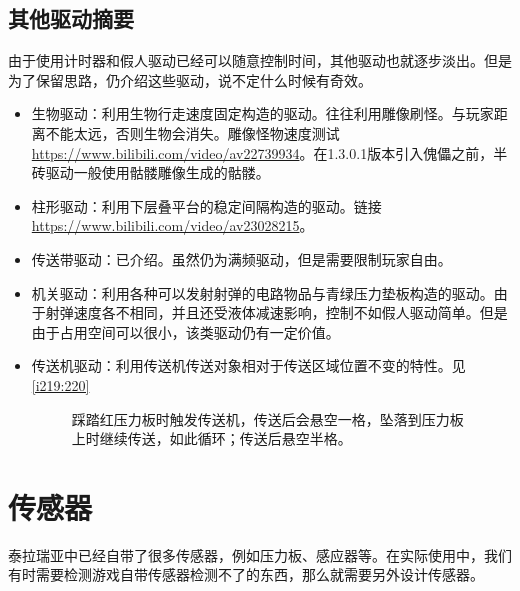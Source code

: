 \subsection{其他驱动摘要}
由于使用计时器和假人驱动已经可以随意控制时间，其他驱动也就逐步淡出。但是为了保留思路，仍介绍这些驱动，说不定什么时候有奇效。
\begin{itemize}
\item 生物驱动：利用生物行走速度固定构造的驱动。往往利用雕像刷怪。与玩家距离不能太远，否则生物会消失。雕像怪物速度测试\url{https://www.bilibili.com/video/av22739934}。在1.3.0.1版本引入傀儡之前，半砖驱动一般使用骷髅雕像生成的骷髅。
\item 柱形驱动：利用下层叠平台的稳定间隔构造的驱动。链接\url{https://www.bilibili.com/video/av23028215}。
\item 传送带驱动：已介绍。虽然仍为满频驱动，但是需要限制玩家自由。
\item 机关驱动：利用各种可以发射射弹的电路物品与青绿压力垫板构造的驱动。由于射弹速度各不相同，并且还受液体减速影响，控制不如假人驱动简单。但是由于占用空间可以很小，该类驱动仍有一定价值。
\item 传送机驱动：利用传送机传送对象相对于传送区域位置不变的特性。见\autoref{i219:220}

\begin{figure}[!h]
\begin{center}
\qquad
{}
\end{center}
\caption{\protect{}踩踏红压力板时触发传送机，传送后会悬空一格，坠落到压力板上时继续传送，如此循环；\protect{}传送后悬空半格。}
\label{i219:220}
\end{figure}

\end{itemize}

\section{传感器}
泰拉瑞亚中已经自带了很多传感器，例如压力板、感应器等。在实际使用中，我们有时需要检测游戏自带传感器检测不了的东西，那么就需要另外设计传感器。

